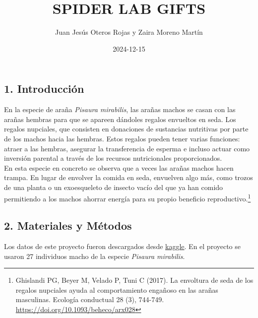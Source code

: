 \documentclass[
]{article}
\title{SPIDER LAB GIFTS}
\author{Juan Jesús Oteros Rojas y Zaira Moreno Martín}
\date{2024-12-15}
\begin{document}
\maketitle

{
\setcounter{tocdepth}{2}
\tableofcontents
}
\subsection{1. Introducción}\label{introducciuxf3n}

En la especie de araña \emph{Pisaura mirabilis}, las arañas machos se
casan con las arañas hembras para que se apareen dándoles regalos
envueltos en seda. Los regalos nupciales, que consisten en donaciones de
sustancias nutritivas por parte de los machos hacia las hembras. Estos
regalos pueden tener varias funciones: atraer a las hembras, asegurar la
transferencia de esperma e incluso actuar como inversión parental a
través de los recursos nutricionales proporcionados.\\
En esta especie en concreto se observa que a veces las arañas machos
hacen trampa. En lugar de envolver la comida en seda, envuelven algo
más, como trozos de una planta o un exoesqueleto de insecto vacío del
que ya han comido permitiendo a los machos ahorrar energía para su
propio beneficio reproductivo.\footnote{Ghislandi PG, Beyer M, Velado P,
  Tuni C (2017). La envoltura de seda de los regalos nupciales ayuda al
  comportamiento engañoso en las arañas masculinas. Ecología conductual
  28 (3), 744-749. \url{https://doi.org/10.1093/beheco/arx028}}

\subsection{2. Materiales y Métodos}\label{materiales-y-muxe9todos}

Los datos de este proyecto fueron descargados desde
\href{https://www.kaggle.com/datasets/mexwell/spider-lab-gifts/data}{kaggle}.
En el proyecto se usaron 27 individuos macho de la especie \emph{Pisaura
mirabilis}.
\end{document}
